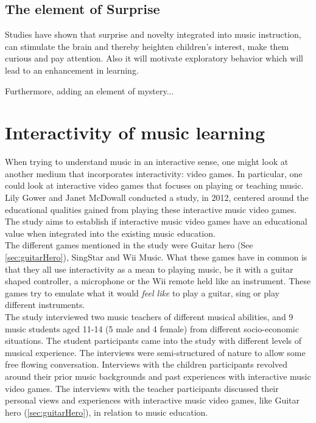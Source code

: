 \subsection{The element of Surprise}
Studies have shown that surprise and novelty integrated into music instruction, can stimulate the brain and thereby heighten children's interest, make them curious and pay attention\cite{bagpipesSurprise}. Also it will motivate exploratory behavior which will lead to an enhancement in learning.



Furthermore, adding an element of mystery...

\section{Interactivity of music learning}	
	When trying to understand music in an interactive sense, one might look at another medium that incorporates interactivity: video games. In particular, one could look at interactive video games that focuses on playing or teaching music. Lily Gower and Janet McDowall conducted a study, in 2012, centered around the educational qualities gained from playing these interactive music video games\cite{interactiveMusicVideoGames}. The study aims to establish if interactive music video games have an educational value when integrated into the existing music education.\\
	
	The different games mentioned in the study were Guitar hero (See \autoref{sec:guitarHero}), SingStar and Wii Music. What these games have in common is that they all use interactivity as a mean to playing music, be it with a guitar shaped controller, a microphone or the Wii remote held like an instrument. These games try to emulate what it would \textit{feel like} to play a guitar, sing or play different instruments.\\
	
	The study interviewed two music teachers of different musical abilities, and 9 music students aged 11-14 (5 male and 4 female) from different socio-economic situations. The student participants came into the study with different levels of musical experience. The interviews were semi-structured of nature to allow some free flowing conversation. Interviews with the children participants revolved around their prior music backgrounds and past experiences with interactive music video games. The interviews with the teacher participants discussed their personal views and experiences with interactive music video games, like Guitar hero (\autoref{sec:guitarHero}), in relation to music education.\\
	
